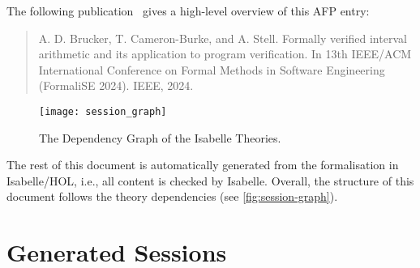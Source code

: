 \documentclass[11pt,DIV=13,a4paper,abstract=true,twoside=semi,openright]
{scrreprt}
\begin{document}
The following publication~\cite{brucker.ea:formally:2024} gives a high-level overview of this AFP entry:
\begin{quote}
  A. D. Brucker, T. Cameron-Burke, and A. Stell. Formally verified interval arithmetic and its application to
  program verification. In 13th IEEE/ACM International Conference on Formal Methods in Software Engineering 
  (FormaliSE 2024). IEEE, 2024.
\end{quote} 

\begin{figure}
  \centering
  \texttt{[image: session\_graph]}
  \caption{The Dependency Graph of the Isabelle Theories.\label{fig:session-graph}}
\end{figure}
The rest of this document is automatically generated from the
formalisation in Isabelle/HOL, i.e., all content is checked by
Isabelle.  Overall, the structure of this document follows the
theory dependencies (see \autoref{fig:session-graph}). 

\part*{Generated Sessions}

\printbibliography
\end{document}
